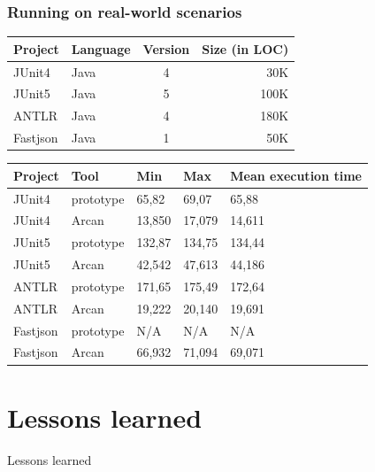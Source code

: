 \documentclass[table]{beamer}
\begin{document}
\begin{frame}
  \frametitle{Running on real-world scenarios}
    \center
    \begin{tabular}{|l l c r|}
      \hline
      \textbf{Project} & \textbf{Language} & \textbf{Version} & \textbf{Size (in LOC)} \\
      \hline
      JUnit4 & Java & 4 & 30K \\
      \hline
      JUnit5 & Java & 5 & 100K \\
      \hline
      ANTLR & Java & 4 & 180K \\
      \hline
      Fastjson & Java & 1 & 50K \\
      \hline
    \end{tabular}
    \center
    \begin{tabular}{|l|l|l|l|l|}
        \hline
        \textbf{Project} & \textbf{Tool} & \textbf{Min} & \textbf{Max} & \textbf{Mean execution time} \\ \hline
        \hline
        \rowcolor[HTML]{EED49F} 
        JUnit4   & prototype & 65,82  & 69,07  & 65,88     \\ \hline
        \rowcolor[HTML]{A6DA95} 
        JUnit4   & Arcan     & 13,850 & 17,079 & 14,611    \\ \hline
        \rowcolor[HTML]{EED49F} 
        JUnit5   & prototype & 132,87 & 134,75 & 134,44    \\ \hline
        \rowcolor[HTML]{A6DA95} 
        JUnit5   & Arcan     & 42,542 & 47,613 & 44,186    \\ \hline
        \rowcolor[HTML]{EED49F} 
        ANTLR    & prototype & 171,65 & 175,49 & 172,64    \\ \hline
        \rowcolor[HTML]{A6DA95} 
        ANTLR    & Arcan     & 19,222 & 20,140 & 19,691    \\ \hline
        \rowcolor[HTML]{ED8796} 
        Fastjson & prototype & N/A    & N/A    & N/A       \\ \hline
        \rowcolor[HTML]{A6DA95} 
        Fastjson & Arcan     & 66,932 & 71,094 & 69,071    \\ \hline
    \end{tabular}
\end{frame}

\section{Lessons learned}
\begin{frame}
  \centering
  \huge Lessons learned
\end{frame}
\end{document}
